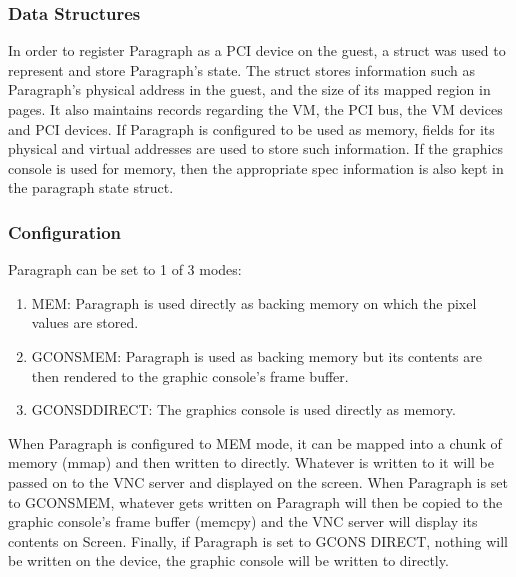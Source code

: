\documentclass{acm_proc_article-sp}
\begin{document}
\subsubsection{Data Structures}
In order to register Paragraph as a PCI device on the guest, a struct was used
to represent and store Paragraph's state. The struct stores information such as
Paragraph's physical address in the guest, and the size of its mapped region in
pages. It also maintains records regarding the VM, the PCI bus, the VM devices and PCI
devices. If Paragraph is configured to be used as memory, fields for its
physical and virtual addresses are used to store such information. If the
graphics console is used for memory, then the appropriate spec information is
also kept in the paragraph state struct. 
\subsubsection{Configuration}
Paragraph can be set to 1 of 3 modes: \\
\begin{enumerate}
\item MEM: Paragraph is used directly as backing memory on which the pixel values
are stored.
\item GCONS\textunderscore MEM: Paragraph is used as backing memory but its contents are
then rendered to the graphic console's frame buffer.
\item GCONSD\textunderscore DIRECT: The graphics console is used directly as memory.
\end{enumerate}
When Paragraph is configured to MEM mode, it can be mapped into a chunk of
memory (mmap) and then written to directly. Whatever is written to it will be
passed on to the VNC server and displayed on the screen. When Paragraph is set
to GCONS\textunderscore MEM, whatever gets written on Paragraph will then be
copied to the graphic console's frame buffer (memcpy) and the VNC server will
display its contents on Screen. Finally, if Paragraph is set to GCONS
\textunderscore DIRECT, nothing will be written on the device, the graphic
console will be written to directly.
\end{document}
